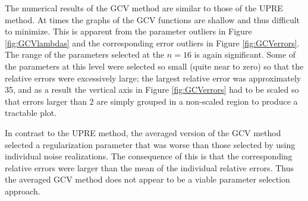 The numerical results of the GCV method are similar to those of the UPRE method. At times the graphs of the GCV functions are shallow and thus difficult to minimize. This is apparent from the parameter outliers in Figure \ref{fig:GCVlambdas} and the corresponding error outliers in Figure \ref{fig:GCVerrors}. The range of the parameters selected at the $n = 16$ is again significant. Some of the parameters at this level were selected so small (quite near to zero) so that the relative errors were excessively large; the largest relative error was approximately 35, and as a result the vertical axis in Figure \ref{fig:GCVerrors} had to be scaled so that errors larger than 2 are simply grouped in a non-scaled region to produce a tractable plot. \par 
In contrast to the UPRE method, the averaged version of the GCV method selected a regularization parameter that was worse than those selected by using individual noise realizations. The consequence of this is that the corresponding relative errors were larger than the mean of the individual relative errors. Thus the averaged GCV method does not appear to be a viable parameter selection approach.

